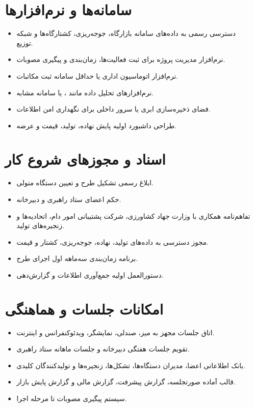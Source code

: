\documentclass[12pt,a4paper]{report}
\begin{document}
\section{سامانه‌ها و نرم‌افزارها}
\begin{itemize}
    \item دسترسی رسمی به داده‌های سامانه بازارگاه، جوجه‌ریزی، کشتارگاه‌ها و شبکه توزیع.
    \item نرم‌افزار مدیریت پروژه برای ثبت فعالیت‌ها، زمان‌بندی و پیگیری مصوبات.
    \item نرم‌افزار اتوماسیون اداری یا حداقل سامانه ثبت مکاتبات.
    \item نرم‌افزارهای تحلیل داده مانند ،  یا سامانه مشابه.
    \item فضای ذخیره‌سازی ابری یا سرور داخلی برای نگهداری امن اطلاعات.
    \item طراحی داشبورد اولیه پایش نهاده، تولید، قیمت و عرضه.
\end{itemize}

\section{اسناد و مجوزهای شروع کار}
\begin{itemize}
    \item ابلاغ رسمی تشکیل طرح و تعیین دستگاه متولی.
    \item حکم اعضای ستاد راهبری و دبیرخانه.
    \item تفاهم‌نامه همکاری با وزارت جهاد کشاورزی، شرکت پشتیبانی امور دام، اتحادیه‌ها و زنجیره‌های تولید.
    \item مجوز دسترسی به داده‌های تولید، نهاده، جوجه‌ریزی، کشتار و قیمت.
    \item برنامه زمان‌بندی سه‌ماهه اول اجرای طرح.
    \item دستورالعمل اولیه جمع‌آوری اطلاعات و گزارش‌دهی.
\end{itemize}

\section{امکانات جلسات و هماهنگی}
\begin{itemize}
    \item اتاق جلسات مجهز به میز، صندلی، نمایشگر، ویدئوکنفرانس و اینترنت.
    \item تقویم جلسات هفتگی دبیرخانه و جلسات ماهانه ستاد راهبری.
    \item بانک اطلاعاتی اعضا، مدیران دستگاه‌ها، تشکل‌ها، زنجیره‌ها و تولیدکنندگان کلیدی.
    \item قالب آماده صورتجلسه، گزارش پیشرفت، گزارش مالی و گزارش پایش بازار.
    \item سیستم پیگیری مصوبات تا مرحله اجرا.
\end{itemize}
\end{document}
